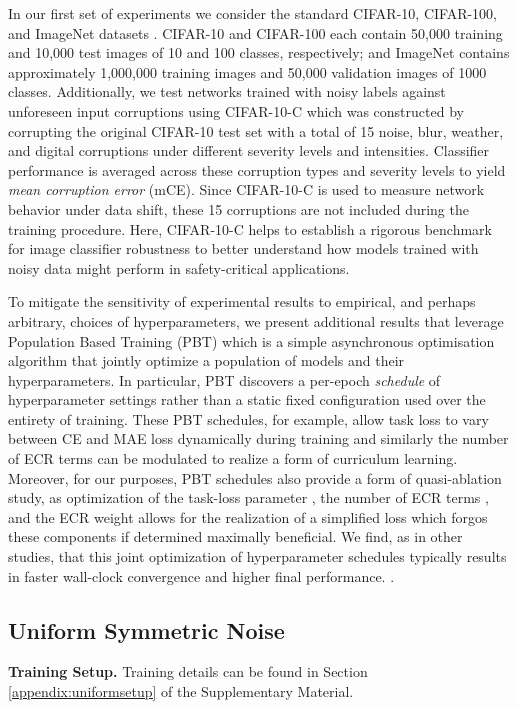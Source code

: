 \documentclass{article}
\begin{document}
In our first set of experiments we consider the standard CIFAR-10, CIFAR-100, and ImageNet datasets \cite{Krizhevsky2009LearningML,deng2009}. CIFAR-10 and CIFAR-100 each contain 50,000 training and 10,000 test images of 10 and 100 classes, respectively; and ImageNet contains approximately 1,000,000 training images and 50,000 validation images of 1000 classes. Additionally, we test networks trained with noisy labels against unforeseen input corruptions using CIFAR-10-C \cite{hendrycks2019robustness} which was constructed by corrupting the original CIFAR-10 test set with a total of 15 noise, blur, weather, and digital corruptions under different severity levels and intensities.  Classifier performance is averaged across these corruption types and severity levels to yield \emph{mean corruption error} (mCE).  Since CIFAR-10-C is used to measure network behavior under data shift, these 15 corruptions are not included during the training procedure.  Here, CIFAR-10-C helps to establish a rigorous benchmark for image classifier robustness to better understand how models trained with noisy data might perform in safety-critical applications.

To mitigate the sensitivity of experimental results to empirical, and perhaps arbitrary, choices of hyperparameters, we present additional results that leverage Population Based Training (PBT) \cite{2017arXiv171109846J, 2019arXiv190201894L} which is a simple asynchronous optimisation algorithm that jointly optimize a population of models and their hyperparameters.  In particular, PBT discovers a per-epoch \emph{schedule} of hyperparameter settings rather than a static fixed configuration used over the entirety of training.  These PBT schedules, for example, allow task loss  to vary between CE and MAE loss dynamically during training and similarly the number of ECR terms  can be modulated to realize a form of curriculum learning.  Moreover, for our purposes, PBT schedules also provide a form of quasi-ablation study, as optimization of the task-loss parameter , the number of ECR terms , and the ECR weight  allows for the realization of a simplified loss which forgos these components if determined maximally beneficial.  We find, as in other studies, that this joint optimization of hyperparameter schedules typically results in faster wall-clock convergence and higher final performance. \cite{2019arXiv190505393H,2019arXiv190201894L}.

\subsection{Uniform Symmetric Noise}
\label{sec:expt:us}
\textbf{Training Setup.} Training details can be found in Section \ref{appendix:uniformsetup} of the Supplementary Material.
\end{document}
